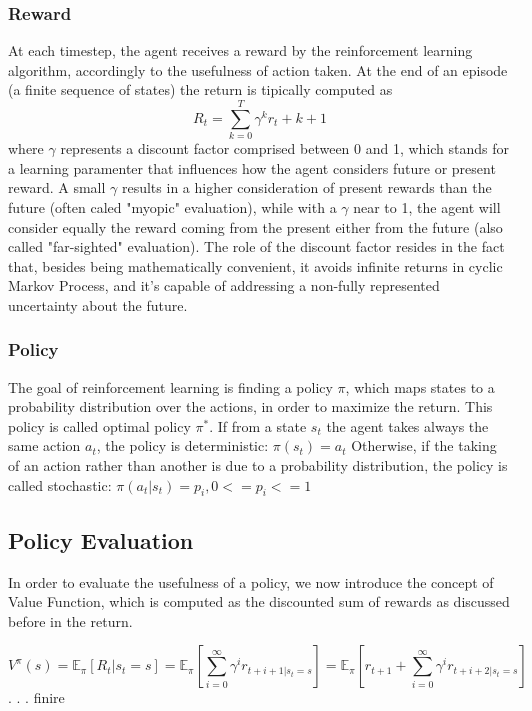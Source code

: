 \subsubsection{Reward}
At each timestep, the agent receives a reward by the reinforcement learning algorithm, accordingly to the usefulness of action taken.
At the end of an episode (a finite sequence of states) the return is tipically computed as \[R_t = \sum^{T}_{k=0}\gamma^k r_t + k +1\] where \(\gamma\) represents a discount factor comprised between 0 and 1, which stands for a learning paramenter that influences how the agent considers future                              or present reward. A small \(\gamma\) results in a higher consideration of present rewards than the future (often caled "myopic" evaluation), while with a \(\gamma\) near to 1, the agent will consider equally the reward coming from the present either from the future (also called "far-sighted" evaluation). The role of the discount factor resides in the fact that, besides being mathematically convenient, it avoids infinite returns in cyclic Markov Process, and it's capable of addressing a non-fully represented uncertainty about the future.

\subsubsection{Policy}
The goal of reinforcement learning is finding a policy \(\pi\), which maps states to a probability distribution over the actions, in order to maximize the return. This policy is called optimal policy \(\pi^*\).
If from a state \(s_t\) the agent takes always the same action \(a_t\), the policy is deterministic:
\(\pi(s_t) = a_t\)
Otherwise, if the taking of an action rather than another is due to a probability distribution, the policy is called stochastic:
\(\pi(a_t|s_t) = p_i, 0<=p_i<=1\)

\subsection{Policy Evaluation}
In order to evaluate the usefulness of a policy, we now introduce the concept of Value Function, which is computed as the discounted sum of rewards as discussed before in the return.


\[V^\pi(s) = \mathbb{E}_\pi{\left[R_t|s_t=s\right]}= \mathbb{E}_\pi\left[\sum^{\infty}_{i=0}\gamma^ir_{t+i+1|s_t=s}\right] = \mathbb{E}_\pi\left[r_{t+1} + \sum^{\infty}_{i=0}\gamma^ir_{t+i+2|s_t=s}\right]\]
. . . finire



